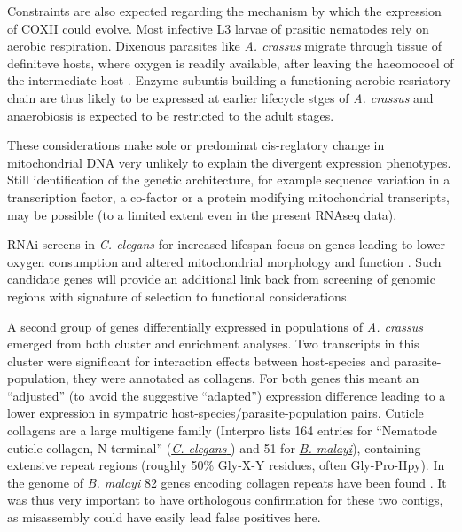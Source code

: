 Constraints are also expected regarding the mechanism by which the
expression of COXII could evolve. Most infective L3 larvae of prasitic
nematodes rely on aerobic respiration. Dixenous parasites like
\textit{A. crassus} migrate through tissue of definiteve hosts, where
oxygen is readily available, after leaving the haeomocoel of the
intermediate host \cite{kennedy2001parasitic}. Enzyme subuntis
building a functioning aerobic resriatory chain are thus likely to be
expressed at earlier lifecycle stges of \textit{A. crassus} and
anaerobiosis is expected to be restricted to the adult stages.

These considerations make sole or predominat cis-reglatory change in
mitochondrial DNA very unlikely to explain the divergent expression
phenotypes. Still identification of the genetic architecture, for
example sequence variation in a transcription factor, a co-factor or a
protein modifying mitochondrial transcripts, may be possible (to a
limited extent even in the present RNAseq data). 

RNAi screens in \textit{C. elegans} for increased lifespan focus on
genes leading to lower oxygen consumption and altered mitochondrial
morphology and function \cite{pmid12447374}. Such candidate genes will
provide an additional link back from screening of genomic regions with
signature of selection to functional considerations.




A second group of genes differentially expressed in populations of
\textit{A. crassus} emerged from both cluster and enrichment
analyses. Two transcripts in this cluster were significant for
interaction effects between host-species and parasite-population, they
were annotated as collagens. For both genes this meant an ``adjusted''
(to avoid the suggestive ``adapted'') expression difference leading to
a lower expression in sympatric host-species/parasite-population
pairs. Cuticle collagens are a large multigene family (Interpro lists
164 entries for ``Nematode cuticle collagen, N-terminal''
(\href{http://www.ebi.ac.uk/interpro/ISpy?ipr=IPR002486&tax=6239}{\textit{C. elegans}
}) and 51 for
\href{http://www.ebi.ac.uk/interpro/ISpy?ipr=IPR002486&tax=6279}{\textit{B. malayi}}),
containing extensive repeat regions (roughly 50\% Gly-X-Y residues,
often Gly-Pro-Hpy). In the genome of \textit{B. malayi} 82 genes
encoding collagen repeats have been found \cite{ghedin_draft_2007}. It
was thus very important to have orthologous confirmation for these two
contigs, as misassembly could have easily lead false positives here.

